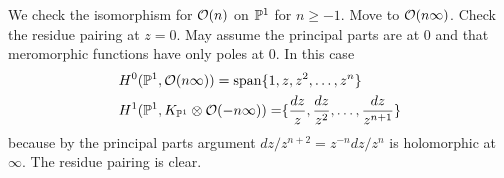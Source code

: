 \documentclass[12pt]{article}
\begin{document}
\begin{example}
    We check the isomorphism for $\cO(n)$ on $\P^1$ for $n \geq -1$. Move to $\cO(n\infty)$. Check the residue pairing at $z=0$. May assume the principal parts are at $0$ and that meromorphic functions have only poles at $0$. In this case \begin{align*}
        H^0(\P^1, \cO(n\infty)) & = \operatorname{span}\set{1, z, z^2, \ldots, z^n} \\
        H^1(\P^1, K_{\P^1} \otimes \cO(-n\infty)) = \span\set{\frac{dz}{z},
        \frac{dz}{z^2}, \ldots, \frac{dz}{z^{n+1}}} 
    \end{align*}
because by the principal parts argument $dz/z^{n+2} = z^{-n} dz/z^n$ is holomorphic at $\infty$. The residue pairing is clear.
\end{example}
\end{document}
